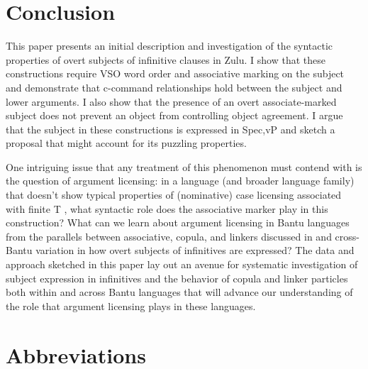 \documentclass[output=paper,colorlinks,citecolor=brown]{langscibook}
\begin{document}
\section{Conclusion}\label{sec:halpert:5}

This paper presents an initial description and investigation of the syntactic properties of overt subjects of infinitive clauses in Zulu.  I show that these constructions require VSO word order and associative marking on the subject and demonstrate that c-command relationships hold between the subject and lower arguments. I also show that the presence of an overt associate-marked subject does not prevent an object from controlling object agreement.  I argue that the subject in these constructions is expressed in Spec,vP and sketch a proposal that might account for its puzzling properties. 

One intriguing issue that any treatment of this phenomenon must contend with is the question of argument licensing: in a language (and broader language family) that doesn't show typical properties of (nominative) case licensing associated with finite T \citep{Diercks2012,Halpert2015}, what syntactic role does the associative marker play in this construction? What can we learn about argument licensing in Bantu languages from the parallels between associative, copula, and linkers discussed in  and cross-Bantu variation in how overt subjects of infinitives are expressed? The data and approach sketched in this paper lay out an avenue for systematic investigation of subject expression in infinitives and the behavior of copula and linker particles both within and across Bantu languages that will advance our understanding of the role that argument licensing plays in these languages.


\section*{Abbreviations}
\end{document}
